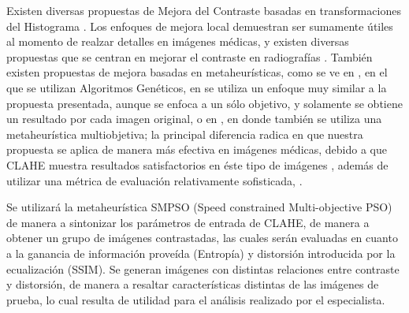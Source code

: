 \documentclass[spanish,twocolumn]{article}
\begin{document}
Existen diversas propuestas de Mejora del Contraste basadas en transformaciones del Histograma \cite{1658094}. Los enfoques de mejora local demuestran ser sumamente útiles al momento de realzar detalles en imágenes médicas, y existen diversas propuestas que se centran en mejorar el contraste en radiografías \cite{1625082,4712472}. También existen propuestas de mejora basadas en metaheurísticas, como se ve en \cite{Hashemi20101816}, en el que se utilizan Algoritmos Genéticos, en \cite{morebrizuela2014} se utiliza un enfoque muy similar a la propuesta presentada, aunque se enfoca a un sólo objetivo, y solamente se obtiene un resultado por cada imagen original, o en \cite{Shanmugavadivu2014243}, en donde también se utiliza una metaheurística multiobjetiva; la principal diferencia radica en que nuestra propuesta se aplica de manera más efectiva en imágenes médicas, debido a que CLAHE muestra resultados satisfactorios en éste tipo de imágenes \cite{reza2004}, además de utilizar una métrica de evaluación relativamente sofisticada, . 


Se utilizará la metaheurística SMPSO (Speed constrained Multi-objective PSO) de manera a sintonizar los parámetros de entrada de CLAHE, de manera a obtener un grupo de imágenes contrastadas, las cuales serán evaluadas en cuanto a la ganancia de información proveída (Entropía) y distorsión introducida por la ecualización (SSIM). Se generan imágenes con distintas relaciones entre contraste y distorsión, de manera a resaltar características distintas de las imágenes de prueba, lo cual resulta de utilidad para el análisis realizado por el especialista.
\end{document}
